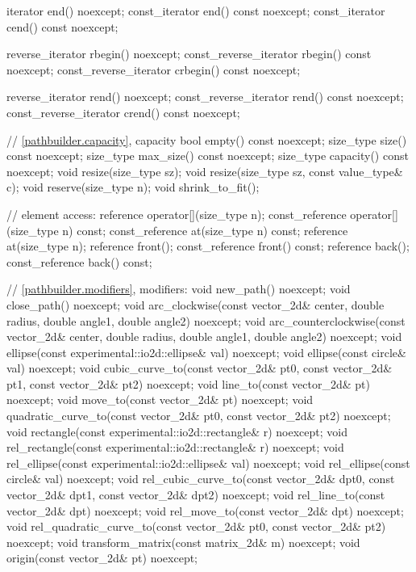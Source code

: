 \begin{codeblock}
{{{{{    iterator end() noexcept;
    const_iterator end() const noexcept;
    const_iterator cend() const noexcept;
    
    reverse_iterator rbegin() noexcept;
    const_reverse_iterator rbegin() const noexcept;
    const_reverse_iterator crbegin() const noexcept;

    reverse_iterator rend() noexcept;
    const_reverse_iterator rend() const noexcept;
    const_reverse_iterator crend() const noexcept;
    
    // \ref{pathbuilder.capacity}, capacity
    bool empty() const noexcept;
    size_type size() const noexcept;
    size_type max_size() const noexcept;
    size_type capacity() const noexcept;
    void resize(size_type sz);
    void resize(size_type sz, const value_type& c);
    void reserve(size_type n);
    void shrink_to_fit();

    // element access:
    reference operator[](size_type n);
    const_reference operator[](size_type n) const;
    const_reference at(size_type n) const;
    reference at(size_type n);
    reference front();
    const_reference front() const;
    reference back();
    const_reference back() const;

    // \ref{pathbuilder.modifiers}, modifiers:
    void new_path() noexcept;
    void close_path() noexcept;
    void arc_clockwise(const vector_2d& center, double radius, double angle1,
      double angle2) noexcept;
    void arc_counterclockwise(const vector_2d& center, double radius,
      double angle1, double angle2) noexcept;
    void ellipse(const experimental::io2d::ellipse& val) noexcept;
    void ellipse(const circle& val) noexcept;
    void cubic_curve_to(const vector_2d& pt0, const vector_2d& pt1,
      const vector_2d& pt2) noexcept;
    void line_to(const vector_2d& pt) noexcept;
    void move_to(const vector_2d& pt) noexcept;
    void quadratic_curve_to(const vector_2d& pt0, const vector_2d& pt2)
      noexcept;
    void rectangle(const experimental::io2d::rectangle& r) noexcept;
    void rel_rectangle(const experimental::io2d::rectangle& r) noexcept;
    void rel_ellipse(const experimental::io2d::ellipse& val) noexcept;
    void rel_ellipse(const circle& val) noexcept;
    void rel_cubic_curve_to(const vector_2d& dpt0, const vector_2d& dpt1,
    const vector_2d& dpt2) noexcept;
    void rel_line_to(const vector_2d& dpt) noexcept;
    void rel_move_to(const vector_2d& dpt) noexcept;
    void rel_quadratic_curve_to(const vector_2d& pt0, const vector_2d& pt2)
      noexcept;
    void transform_matrix(const matrix_2d& m) noexcept;
    void origin(const vector_2d& pt) noexcept;
    
}}}}}
\end{codeblock}
